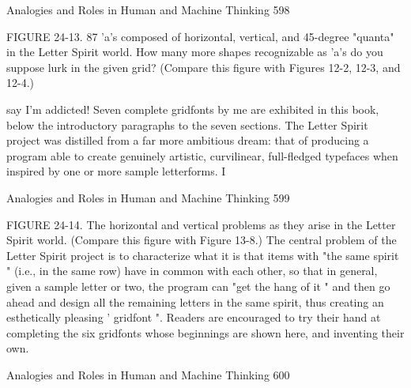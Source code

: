 Analogies and Roles in Human and Machine Thinking                                     598

FIGURE 24-13. 87 'a's composed of horizontal, vertical, and 45-degree "quanta" in
the Letter Spirit world. How many more shapes recognizable as 'a's do you suppose
lurk in the given grid? (Compare this figure with Figures 12-2, 12-3, and 12-4.)

say I'm addicted! Seven complete gridfonts by me are exhibited in this book, below
the introductory paragraphs to the seven sections.
        The Letter Spirit project was distilled from a far more ambitious dream: that of
producing a program able to create genuinely artistic, curvilinear, full-fledged
typefaces when inspired by one or more sample letterforms. I




Analogies and Roles in Human and Machine Thinking                                   599

FIGURE 24-14. The horizontal and vertical problems as they arise in the Letter Spirit
world. (Compare this figure with Figure 13-8.) The central problem of the Letter
Spirit project is to characterize what it is that items with "the same spirit " (i.e., in the
same row) have in common with each other, so that in general, given a sample letter
or two, the program can "get the hang of it " and then go ahead and design all the
remaining letters in the same spirit, thus creating an esthetically pleasing ' gridfont ".
Readers are encouraged to try their hand at completing the six gridfonts whose
beginnings are shown here, and inventing their own.




Analogies and Roles in Human and Machine Thinking                                       600

